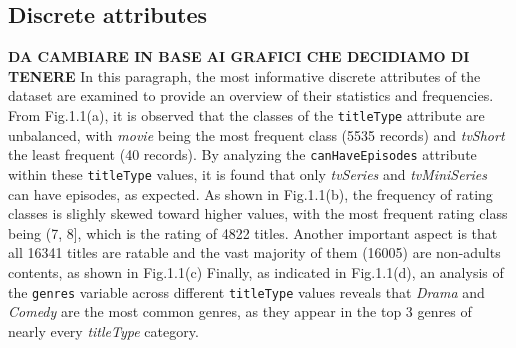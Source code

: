 \subsection{Discrete attributes}
\textbf{DA CAMBIARE IN BASE AI GRAFICI CHE DECIDIAMO DI TENERE}
In this paragraph, the most informative discrete attributes of the dataset are examined to provide an overview of their statistics and frequencies. \\
From Fig.1.1(a), it is observed that the classes of the \texttt{titleType} attribute are unbalanced, with \textit{movie} being the most frequent class (5535 records) and \textit{tvShort} the least frequent (40 records). 
By analyzing the \texttt{canHaveEpisodes} attribute within these \texttt{titleType} values, it is found that only \textit{tvSeries} and \textit{tvMiniSeries} can have episodes, as expected.
As shown in Fig.1.1(b), the frequency of rating classes is slighly skewed toward higher values, with the most frequent rating class being (7, 8], which is the rating of 4822 titles.
Another important aspect is that all 16341 titles are ratable and the vast majority of them (16005) are non-adults contents, as shown in Fig.1.1(c)
Finally, as indicated in Fig.1.1(d), an analysis of the \texttt{genres} variable across different \texttt{titleType} values reveals that \textit{Drama} and \textit{Comedy} are the most common genres, as they appear in the top 3 genres of nearly every \textit{titleType} category.


